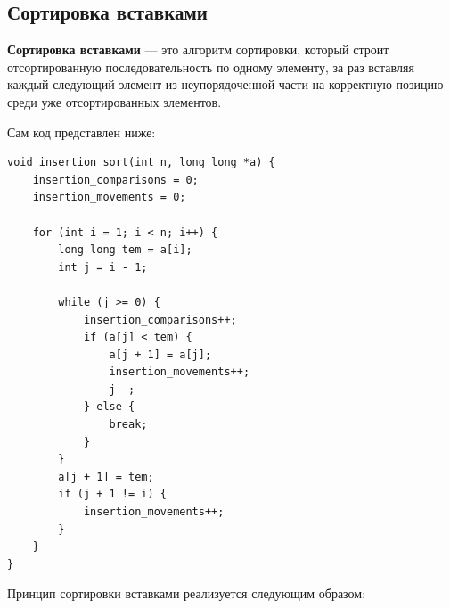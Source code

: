 \documentclass[a4paper,12pt,titlepage,finall]{article}
\begin{document}
\subsection{Сортировка вставками}
{\bf Сортировка вставками} — это алгоритм сортировки, который строит отсортированную последовательность по одному элементу, за раз вставляя каждый следующий элемент из неупорядоченной части на корректную позицию среди уже отсортированных элементов.

Сам код представлен ниже:

\begin{verbatim}
void insertion_sort(int n, long long *a) {
    insertion_comparisons = 0;
    insertion_movements = 0;
    
    for (int i = 1; i < n; i++) {
        long long tem = a[i];
        int j = i - 1;

        while (j >= 0) {
            insertion_comparisons++;
            if (a[j] < tem) {
                a[j + 1] = a[j];
                insertion_movements++;
                j--;
            } else {
                break;
            }
        }
        a[j + 1] = tem;
        if (j + 1 != i) {
            insertion_movements++;
        }
    }
}

\end{verbatim}

Принцип сортировки вставками реализуется следующим образом:
\end{document}
